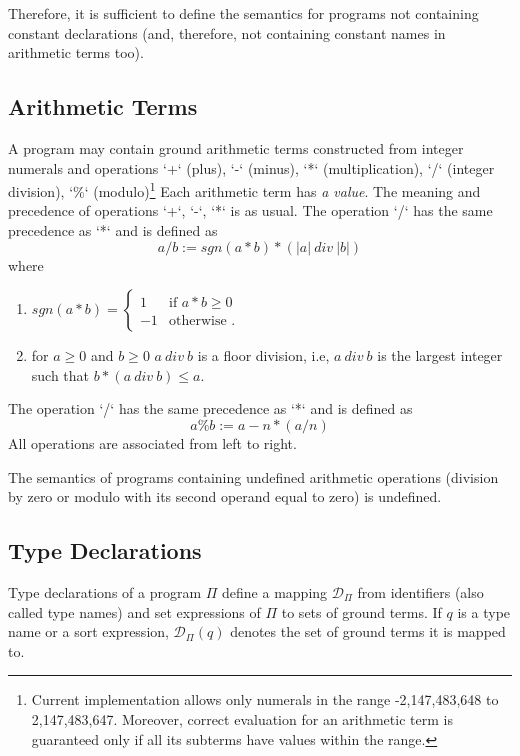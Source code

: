 \documentclass[a4paper,10pt]{article}
\begin{document}
\medskip\noindent
Therefore, it is sufficient to define the semantics for programs not containing constant declarations (and, therefore, not containing constant names in arithmetic terms too).

\subsection{Arithmetic Terms}\label{at}

A program may contain ground arithmetic terms constructed from integer numerals and operations `+` (plus),  `-` (minus), `*` (multiplication), `/` (integer division), `\%` (modulo)\footnote{Current implementation allows only numerals in the range -2,147,483,648 to 2,147,483,647. Moreover, correct evaluation for an arithmetic term is guaranteed only if all its subterms have values within the range.} Each arithmetic term  has \textit{a value}. 
The meaning and precedence of operations  `+`,  `-`, `*` is as usual. The  operation `/` has the same precedence as `*` and is defined as $$a/b := sgn(a*b) *(|a|~div~|b|)$$
where 
\begin{enumerate}
\item $sgn(a*b) = \begin{cases} 1 &\mbox{if } a *b \ge 0 \\
-1 & \mbox{otherwise }. \end{cases} $
\item for $a\ge 0$ and $b\ge0$ $a~div~b$ is a floor division, i.e, $a~div~b$ is the largest integer such that $b * (a~div~b)  \le  a$.
\end{enumerate}
The  operation `/` has the same precedence as `*` and is defined as $$a\%b := a - n * (a/n) $$
All operations are associated from left to right. 


\medskip\noindent
The semantics of programs containing undefined arithmetic operations (division by zero or modulo with its second operand equal to zero) is undefined.  

  


\subsection{Type Declarations} \label{types}
Type declarations of a program $\Pi$  define a mapping $\mathcal{D}_\Pi$ from identifiers (also called type names) and set expressions of $\Pi$  to sets of ground terms. If $q$ is a type name or a sort expression, $\mathcal{D}_\Pi(q)$  denotes the set of ground terms it is mapped to. 
\end{document}
